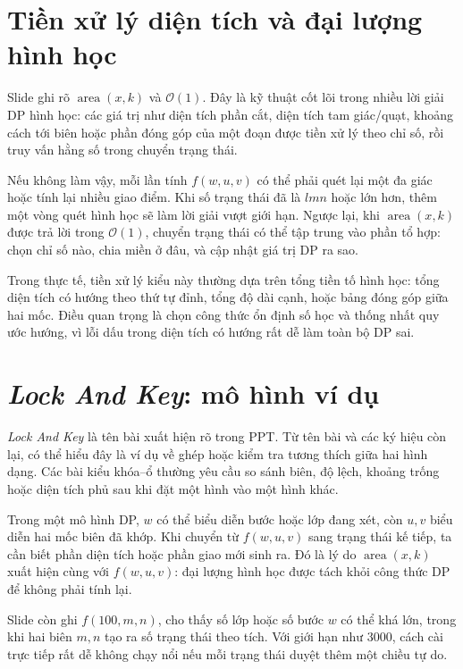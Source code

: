 \documentclass[11pt]{article}
\newcommand{\Oh}{\mathcal{O}}
\begin{document}
\section{Tiền xử lý diện tích và đại lượng hình học}

Slide ghi rõ \(\operatorname{area}(x,k)\) và \(\Oh(1)\). Đây là kỹ thuật cốt
lõi trong nhiều lời giải DP hình học: các giá trị như diện tích phần cắt,
diện tích tam giác/quạt, khoảng cách tới biên hoặc phần đóng góp của một đoạn
được tiền xử lý theo chỉ số, rồi truy vấn hằng số trong chuyển trạng thái.

Nếu không làm vậy, mỗi lần tính \(f(w,u,v)\) có thể phải quét lại một đa giác
hoặc tính lại nhiều giao điểm. Khi số trạng thái đã là \(lmn\) hoặc lớn hơn,
thêm một vòng quét hình học sẽ làm lời giải vượt giới hạn. Ngược lại, khi
\(\operatorname{area}(x,k)\) được trả lời trong \(\Oh(1)\), chuyển trạng thái
có thể tập trung vào phần tổ hợp: chọn chỉ số nào, chia miền ở đâu, và cập
nhật giá trị DP ra sao.

Trong thực tế, tiền xử lý kiểu này thường dựa trên tổng tiền tố hình học:
tổng diện tích có hướng theo thứ tự đỉnh, tổng độ dài cạnh, hoặc bảng đóng
góp giữa hai mốc. Điều quan trọng là chọn công thức ổn định số học và thống
nhất quy ước hướng, vì lỗi dấu trong diện tích có hướng rất dễ làm toàn bộ DP
sai.

\section{\textit{Lock And Key}: mô hình ví dụ}

\textit{Lock And Key} là tên bài xuất hiện rõ trong PPT. Từ tên bài và các ký
hiệu còn lại, có thể hiểu đây là ví dụ về ghép hoặc kiểm tra tương thích giữa
hai hình dạng. Các bài kiểu khóa--ổ thường yêu cầu so sánh biên, độ lệch,
khoảng trống hoặc diện tích phủ sau khi đặt một hình vào một hình khác.

Trong một mô hình DP, \(w\) có thể biểu diễn bước hoặc lớp đang xét, còn
\(u,v\) biểu diễn hai mốc biên đã khớp. Khi chuyển từ \(f(w,u,v)\) sang trạng
thái kế tiếp, ta cần biết phần diện tích hoặc phần giao mới sinh ra. Đó là
lý do \(\operatorname{area}(x,k)\) xuất hiện cùng với \(f(w,u,v)\): đại lượng
hình học được tách khỏi công thức DP để không phải tính lại.

Slide còn ghi \(f(100,m,n)\), cho thấy số lớp hoặc số bước \(w\) có thể khá
lớn, trong khi hai biên \(m,n\) tạo ra số trạng thái theo tích. Với giới hạn
như \(3000\), cách cài trực tiếp rất dễ không chạy nổi nếu mỗi trạng thái
duyệt thêm một chiều tự do.
\end{document}
